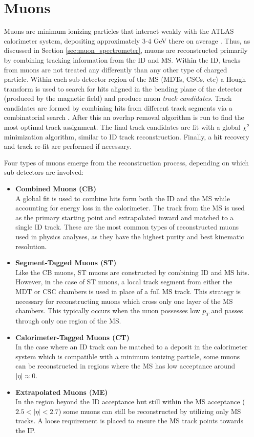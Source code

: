 \section{Muons}
Muons are minimum ionizing particles that interact weakly with the ATLAS calorimeter system, depositing approximately 3-4 GeV there on average \cite{Lenzi_2010}.
Thus, as discussed in Section \ref{sec:muon_spectrometer}, muons are reconstructed primarily by combining tracking information from the ID and MS.
Within the ID, tracks from muons are not treated any differently than any other type of charged particle.
Within each sub-detector region of the MS (MDTs, CSCs, etc) a Hough transform \cite{10.1016/S0734-189X(88)80033-1} is used to search for hits aligned in the bending plane of the detector (produced by the magnetic field) and produce muon \textit{track candidates}.
Track candidates are formed by combining hits from different track segments via a combinatorial search \cite{Aad:2016jkr}.
After this an overlap removal algorithm is run to find the most optimal track assignment.
The final track candidates are fit with a global $\chi^2$ minimization algorithm, similar to ID track reconstruction.
Finally, a hit recovery and track re-fit are performed if necessary.

Four types of muons emerge from the reconstruction process, depending on which sub-detectors are involved:
\begin{itemize}
    \item \textbf{Combined Muons (CB)}\\
        A global fit is used to combine hits form both the ID and the MS while accounting for energy loss in the calorimeter.
        The track from the MS is used as the primary starting point and extrapolated inward and matched to a single ID track.
        These are the most common types of reconstructed muons used in physics analyses, as they have the highest purity and best kinematic resolution.
    \item \textbf{Segment-Tagged Muons (ST)}\\
        Like the CB muons, ST muons are constructed by combining ID and MS hits.
        However, in the case of ST muons, a local track segment from either the MDT or CSC chambers is used in place of a full MS track.
        This strategy is necessary for reconstructing muons which cross only one layer of the MS chambers.
        This typically occurs when the muon possesses low $p_T$ and passes through only one region of the MS.
    \item \textbf{Calorimeter-Tagged Muons (CT)}\\
        In the case where an ID track can be matched to a deposit in the calorimeter system which is compatible with a minimum ionizing particle, some muons can be reconstructed in regions where the MS has low acceptance around $|\eta| \approx 0$.
    \item \textbf{Extrapolated Muons (ME)}\\
        In the region beyond the ID acceptance but still within the MS acceptance ($2.5 < |\eta| < 2.7$) some muons can still be reconstructed by utilizing only MS tracks. A loose requirement is placed to ensure the MS track points towards the IP.
\end{itemize}

